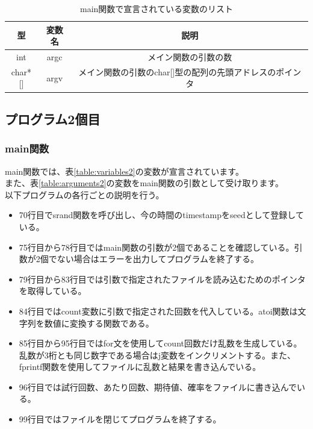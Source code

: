 \documentclass[dvipdfmx]{jsarticle}
\begin{document}
\begin{table}[ht]
  \centering
  \begin{tabular}{|c|c|c|}
    \hline
    型       & 変数名  & 説明                              \\
    \hline
    int     & argc & メイン関数の引数の数                      \\
    char*[] & argv & メイン関数の引数のchar[]型の配列の先頭アドレスのポインタ \\
    \hline
  \end{tabular}
  \caption{main関数で宣言されている変数のリスト}
  \label{table:arguments}
\end{table}

\subsection{プログラム2個目}
\subsubsection{main関数}
main関数では、表\ref{table:variables2}の変数が宣言されています。\\
また、表\ref{table:arguments2}の変数をmain関数の引数として受け取ります。\\
以下プログラムの各行ごとの説明を行う。

\begin{itemize}
  \item 70行目でsrand関数を呼び出し、今の時間のtimestampをseedとして登録している。
  \item 75行目から78行目ではmain関数の引数が2個であることを確認している。引数が2個でない場合はエラーを出力してプログラムを終了する。
  \item 79行目から83行目では引数で指定されたファイルを読み込むためのポインタを取得している。
  \item 84行目ではcount変数に引数で指定された回数を代入している。atoi関数は文字列を数値に変換する関数である。
  \item 85行目から95行目ではfor文を使用してcount回数だけ乱数を生成している。乱数が3桁とも同じ数字である場合はj変数をインクリメントする。また、fprintf関数を使用してファイルに乱数と結果を書き込んでいる。
  \item 96行目では試行回数、あたり回数、期待値、確率をファイルに書き込んでいる。
  \item 99行目ではファイルを閉じてプログラムを終了する。
\end{itemize}
\end{document}
